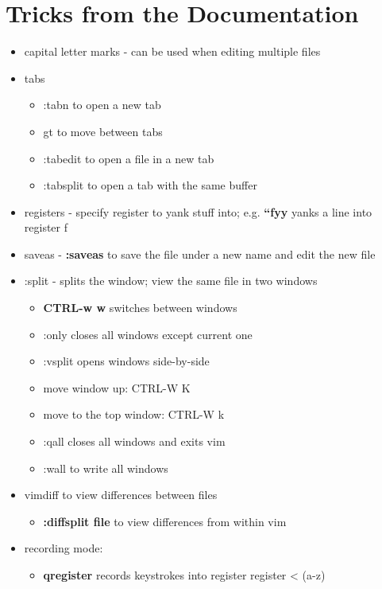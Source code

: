 \documentclass[12pt]{article}
\begin{document}
\section{Tricks from the Documentation}
\begin{itemize}
    \item capital letter marks - can be used when editing multiple files
    \item tabs 
        \begin{itemize}
            \item :tabn to open a new tab
            \item gt to move between tabs 
            \item :tabedit to open a file in a new tab
            \item :tabsplit to open a tab with the same buffer
        \end{itemize}
    \item registers - specify register to yank stuff into; e.g. \textbf{``fyy} yanks a line into register f
    \item saveas - \textbf{:saveas }to save the file under a new name and edit the new file
    \item :split - splits the window; view the same file in two windows
        \begin{itemize}
            \item \textbf{CTRL-w w} switches between windows
            \item :only closes all windows except current one
            \item :vsplit opens windows side-by-side
            \item move window up: CTRL-W K
            \item move to the top window: CTRL-W k
            \item :qall closes all windows and exits vim
            \item :wall to write all windows
        \end{itemize}
    \item vimdiff to view differences between files
        \begin{itemize}
            \item \textbf{:diffsplit file} to view differences from within vim
        \end{itemize}
    \item recording mode:
        \begin{itemize}
            \item \textbf{q{register}} records keystrokes into register {register} < (a-z)

\end{itemize}
\end{itemize}
\end{document}
